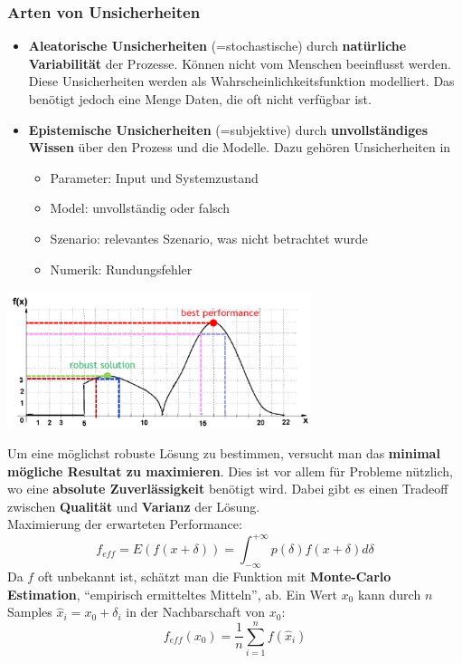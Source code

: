 \documentclass[a4paper]{article}
\begin{document}
\subsubsection{Arten von Unsicherheiten}
\begin{itemize}
	\item \textbf{Aleatorische Unsicherheiten} (=stochastische) durch \textbf{natürliche Variabilität} der Prozesse. Können nicht vom Menschen beeinflusst werden. Diese Unsicherheiten werden als Wahrscheinlichkeitsfunktion modelliert. Das benötigt jedoch eine Menge Daten, die oft nicht verfügbar ist.
	\item \textbf{Epistemische Unsicherheiten} (=subjektive) durch \textbf{unvollständiges Wissen} über den Prozess und die Modelle. Dazu gehören Unsicherheiten in
	\begin{itemize}
		\item Parameter: Input und Systemzustand
		\item Model: unvollständig oder falsch
		\item Szenario: relevantes Szenario, was nicht betrachtet wurde
		\item Numerik: Rundungsfehler
	\end{itemize}
\end{itemize}

\begin{center}
	\includegraphics[height = 4cm]{RobustMax.png}
\end{center}

Um eine möglichst robuste Lösung zu bestimmen, versucht man das \textbf{minimal mögliche Resultat zu maximieren}. Dies ist vor allem für Probleme nützlich, wo eine \textbf{absolute Zuverlässigkeit} benötigt wird. Dabei gibt es einen Tradeoff zwischen \textbf{Qualität} und \textbf{Varianz} der Lösung.\\

Maximierung der erwarteten Performance:
$$f_{eff} = E(f(x+\delta)) = \int_{-\infty}^{+\infty}p(\delta)f(x+\delta)d\delta$$
Da $f$ oft unbekannt ist, schätzt man die Funktion mit \textbf{Monte-Carlo Estimation}, ``empirisch ermitteltes Mitteln'', ab. Ein Wert $x_0$ kann durch $n$ Samples $\hat{x}_i = x_0+\delta_i$ in der Nachbarschaft von $x_0$:
$$f_{eff}(x_0)=\dfrac{1}{n}\sum_{i=1}^{n}f(\hat{x}_i)$$
\end{document}
